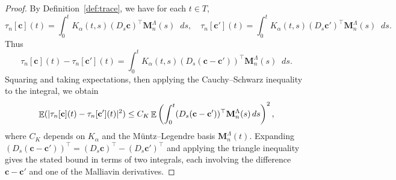 \documentclass[11pt, a4paper]{article}
\theoremstyle{theoremstyle}
\theoremstyle{definitionstyle}
\newcommand{\dd}{\mathop{}\!d}
\DeclareMathOperator{\EE}{\mathbb E}
\DeclarePairedDelimiter{\abs}{\lvert}{\rvert}
\begin{document}
\begin{proof}
    By Definition~\ref{def:trace}, we have for each $t \in T$,
    \begin{equation}
        \tau_n[\mathbf c](t) = \int_0^t K_\alpha(t, s)(D_s \mathbf c)^\top \mathbf M_n^\Lambda(s) \dd{s}, \quad \tau_n[\mathbf c'](t) = \int_0^t K_\alpha(t, s)(D_s \mathbf c')^\top \mathbf M_n^\Lambda(s) \dd{s}.
    \end{equation}
    Thus
    \begin{equation}
        \tau_n[\mathbf c](t) - \tau_n[\mathbf c'](t) = \int_0^t K_\alpha(t, s)(D_s (\mathbf c - \mathbf c'))^\top \mathbf M_n^\Lambda(s) \dd{s}.
    \end{equation}
    Squaring and taking expectations, then applying the Cauchy--Schwarz inequality to the integral, we obtain
    \begin{equation}
        \EE(\abs{\tau_n[\mathbf c](t) - \tau_n[\mathbf c'](t)}^2) \leq C_K \EE \left ( \int_0^t (D_s(\mathbf c - \mathbf c'))^\top \mathbf M_n^\Lambda(s) \dd{s} \right )^2,
    \end{equation}
    where $C_K$ depends on $K_\alpha$ and the Müntz--Legendre basis $\mathbf M_n^\Lambda(t)$. Expanding $(D_s(\mathbf c - \mathbf c'))^\top = (D_s \mathbf c)^\top - (D_s \mathbf c')^\top$ and applying the triangle inequality gives the stated bound in terms of two integrals, each involving the difference $\mathbf c - \mathbf c'$ and one of the Malliavin derivatives.
\end{proof}
\end{document}
